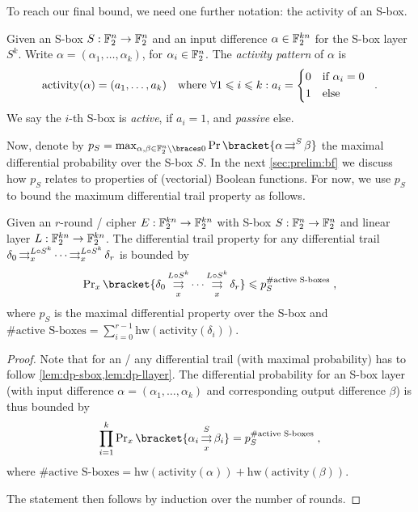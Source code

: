 To reach our final bound, we need one further notation: the activity of an S-box.
\begin{definition}\label{def:activity}
    Given an S-box $S : \mathbb{F}_2^n \to \mathbb{F}_2^n$ and an input difference $\alpha \in \mathbb{F}_2^{kn}$ for the S-box layer $S^k$.
    Write $\alpha = (\alpha_1, \ldots, \alpha_k)$, for $\alpha_i \in \mathbb{F}_2^n$.
    The \emph{activity pattern} of $\alpha$ is
    \begin{equation*}
        \mathrm{activity}(\alpha) = (a_1, \ldots, a_k) \quad \text{where}\ \forall 1 \leqslant i \leqslant k : a_i = \begin{cases*}
            0 & if $\alpha_i = 0$ \\
            1 & else
        \end{cases*}\;.
    \end{equation*}
    We say the $i$-th S-box is \emph{active}, if $a_i = 1$, and \emph{passive} else.
\end{definition}

Now, denote by $p_S = \max_{\alpha, \beta \in \F_2^n \setminus \set{0}} \Prob\bracket{\propDiff{\alpha}{S}{}{\beta}}$ the maximal differential probability over the S-box $S$.
In the next \cref{sec:prelim:bf} we discuss how $p_S$ relates to properties of (vectorial) Boolean functions.
For now, we use $p_S$ to bound the maximum differential trail property as follows.
\begin{lemma}\label{lem:bound-dp-trail}
    Given an $r$-round \SPN/ cipher $E : \mathbb{F}_2^{kn} \to \mathbb{F}_2^{kn}$ with S-box $S : \mathbb{F}_2^n \to \mathbb{F}_2^n$ and linear layer $L : \mathbb{F}_2^{kn} \to \mathbb{F}_2^{kn}$.
    The differential trail property for any differential trail $\delta_0 \operatorname*{\rightrightarrows}^{L \circ S^k}_{x} \cdots \operatorname*{\rightrightarrows}^{L \circ S^k}_{x} \delta_r$ is bounded by
    \begin{equation*}
        \Prob_x\bracket{\propDiff{\delta_0}{L \circ S^k}{x}{\propDiff{\cdots}{L \circ S^k}{x}{\delta_r}}}
        \leqslant p_S^{\text{\#active S-boxes}}\;,
    \end{equation*}
    where $p_S$ is the maximal differential property over the S-box and $\text{\#active S-boxes} = \sum_{i=0}^{r-1} \mathrm{hw}(\mathrm{activity}(\delta_i))$.
\end{lemma}
\begin{proof}
    Note that for an \SPN/ any differential trail (with maximal probability) has to follow \cref{lem:dp-sbox,lem:dp-llayer}.
    The differential probability for an S-box layer (with input difference $\alpha = (\alpha_1, \ldots, \alpha_k)$ and corresponding output difference $\beta$) is thus bounded by
    \begin{equation*}
        \prod_{i=1}^k \Prob_x\bracket{\propDiff{\alpha_i}{S}{x}{\beta_i}} = p_S^{\text{\#active S-boxes}}\;,
    \end{equation*}
    where $\text{\#active S-boxes} = \mathrm{hw}(\mathrm{activity}(\alpha)) + \mathrm{hw}(\mathrm{activity}(\beta))$.

    The statement then follows by induction over the number of rounds.
\end{proof}

